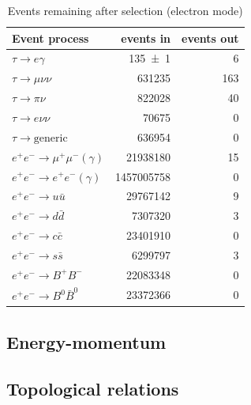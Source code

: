 \documentclass[12pt]{thesis}  %
\begin{document}
\begin{table}[h]
\centering
\begin{tabular}{lrr}
\textbf{Event process}         & \textbf{events in} & \textbf{events out} \\ \hline 
\rowcolor[HTML]{EFEFEF} 
$\tau\to e\gamma$       & \num{135 \pm 1}        & 6                             \\
$\tau\to\mu\nu\nu$      & \num{631235}             & 163                    \\
$\tau\to\pi\nu$         & \num{822028}                & 40                                     \\
$\tau\to e\nu\nu$       & \num   {70675}              & 0                                  \\
$\tau\to\text{generic}$  & \num{636954}           & 0                                   \\
$e^+ e^- \to \mu^+ \mu^- (\gamma)$       & \num{21938180}        & 15             \\
$e^+ e^- \to e^+ e^- (\gamma)$      & \num{1457005758}      & 0                               \\
$e^+ e^- \to u \bar{u}$       & \num{29767142}           & 9                                 \\
$e^+ e^- \to d \bar{d}$        & \num{7307320}           & 3                                \\
$e^+ e^- \to c \bar{c}$        & \num{23401910}           & 0                            \\
$e^+ e^- \to s \bar{s}$       & \num{6299797}           & 3                                       \\
$e^+ e^- \to B^+ B^-$     & \num{22083348}           & 0                            \\
$e^+ e^- \to B^0 \bar{B}^0$       & \num{23372366}           & 0                           
\end{tabular}
\caption{Events remaining after selection (electron mode)}
\label{my-label}
\end{table}

\subsection{Energy-momentum}


\subsection{Topological relations}
\end{document}
